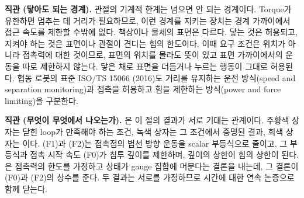 \documentclass[11pt]{article}\usepackage[margin=1in]{geometry}\usepackage{amsmath,amssymb,amsthm,mathtools}\usepackage{graphicx}\graphicspath{{figures/}{../figures/}{figs/}{./}}\usepackage{enumitem}\usepackage{hyperref}\usepackage{cleveref}\usepackage{tikz}\usetikzlibrary{arrows.meta,positioning,calc,shapes.geometric}\usepackage{float}\usepackage{rotating}\usepackage[most]{tcolorbox}\usepackage{kotex}\usepackage{booktabs}\usepackage{longtable}\emergencystretch=1.6em\tolerance=2000 \crefname{assumption}{Assumption}{Assumptions}\Crefname{assumption}{Assumption}{Assumptions}\crefname{definition}{Definition}{Definitions}\Crefname{definition}{Definition}{Definitions}\crefname{proposition}{Proposition}{Propositions}\Crefname{proposition}{Proposition}{Propositions}\crefname{fact}{Fact}{Facts}\Crefname{fact}{Fact}{Facts} \newtheorem{assumption}{Assumption}\newtheorem{definition}{Definition}\newtheorem{lemma}{Lemma}\newtheorem{proposition}{Proposition}\newtheorem{theorem}{Theorem}\newtheorem{corollary}{Corollary}\newtheorem{fact}{Fact}\theoremstyle{remark}\newtheorem{remark}{Remark} \newcommand{\R}{\mathbb{R}}\newcommand{\xb}{\bar x}\newcommand{\Ab}{\bar A}\newcommand{\By}{\bar B_y}\newcommand{\U}{\mathcal U}\newcommand{\Z}{\mathcal Z}
\begin{document}
\textbf{직관 (닿아도 되는 경계).} 관절의 기계적 한계는 넘으면 안 되는 경계이다. Torque가 유한하면 멈추는 데 거리가 필요하므로, 이런 경계를 지키는 장치는 경계 가까이에서 접근 속도를 제한할 수밖에 없다. 책상이나 물체의 표면은 다르다. 닿는 것은 허용되고, 지켜야 하는 것은 표면이나 관절이 견디는 힘의 한도이다. 이때 요구 조건은 위치가 아니라 접촉력에 대한 것이므로, 표면의 위치를 몰라도 뜻이 있고 표면 가까이에서의 운동을 따로 제한하지 않는다. 닿은 채로 표면을 더듬거나 누르는 행동이 그대로 허용된다. 협동 로봇의 표준 ISO/TS 15066 (2016)도 거리를 유지하는 운전 방식(speed and separation monitoring)과 접촉을 허용하고 힘을 제한하는 방식(power and force limiting)을 구분한다.

\textbf{직관 (무엇이 무엇에서 나오는가).} 은 이 절의 결과가 서로 기대는 관계이다. 주황색 상자는 닫힌 loop가 만족해야 하는 조건, 녹색 상자는 그 조건에서 증명된 결과, 회색 상자는 이다. (F1)과 (F2)는 접촉점의 법선 방향 운동을 scalar 부등식으로 줄이고, 그 부등식과 접촉 시작 속도 (F0)가 침투 깊이를 제한하며, 깊이의 상한이 힘의 상한이 된다. 은 접촉력의 한도를 가정하고 상태가 gauge 집합에 머문다는 결론을 내는데, 그 결론이 (F0)과 (F2)의 상수를 준다. 두 결과는 서로를 가정하므로 시간에 대한 연속 논증으로 함께 닫는다.
\end{document}
